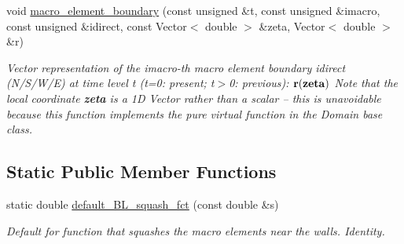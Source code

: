 \begin{DoxyCompactItemize}
void \hyperlink{classoomph_1_1CollapsibleChannelDomain_a2c0a5bd21e12fbcc1cdd753c0f205da2}{macro\+\_\+element\+\_\+boundary} (const unsigned \&t, const unsigned \&imacro, const unsigned \&idirect, const Vector$<$ double $>$ \&zeta, Vector$<$ double $>$ \&r)
\begin{DoxyCompactList}\small\item\em Vector representation of the imacro-\/th macro element boundary idirect (N/\+S/\+W/E) at time level t (t=0\+: present; t$>$0\+: previous)\+: $ {\bf r}({\bf zeta}) $ Note that the local coordinate {\bfseries zeta} is a 1D Vector rather than a scalar -- this is unavoidable because this function implements the pure virtual function in the Domain base class. \end{DoxyCompactList}\end{DoxyCompactItemize}
\subsection*{Static Public Member Functions}
\begin{DoxyCompactItemize}
\item 
static double \hyperlink{classoomph_1_1CollapsibleChannelDomain_a4222184a903df3efdd93cc306bac4414}{default\+\_\+\+B\+L\+\_\+squash\+\_\+fct} (const double \&s)
\begin{DoxyCompactList}\small\item\em Default for function that squashes the macro elements near the walls. Identity. \end{DoxyCompactList}\end{DoxyCompactItemize}
